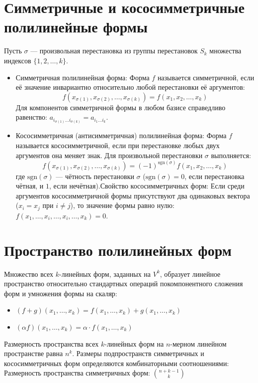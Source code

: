 \documentclass[14pt]{extreport}
\begin{document}
    \section{Симметричные и кососимметричные полилинейные формы}

    Пусть $\sigma$ — произвольная перестановка из группы перестановок $S_k$ множества индексов $\{1, 2, \dots, k\}$.
    \begin{itemize}
        \item Симметричная полилинейная форма: Форма $f$ называется симметричной, если её значение инвариантно относительно любой перестановки её аргументов:$$f(x_{\sigma(1)}, x_{\sigma(2)}, \dots, x_{\sigma(k)}) = f(x_1, x_2, \dots, x_k)$$Для компонентов симметричной формы в любом базисе справедливо равенство: $a_{i_{\sigma(1)} \dots i_{\sigma(k)}} = a_{i_1 \dots i_k}$.
        \item Кососимметричная (антисимметричная) полилинейная форма: Форма $f$ называется кососимметричной, если при перестановке любых двух аргументов она меняет знак. Для произвольной перестановки $\sigma$ выполняется:$$f(x_{\sigma(1)}, x_{\sigma(2)}, \dots, x_{\sigma(k)}) = (-1)^{\text{sgn}(\sigma)} f(x_1, x_2, \dots, x_k)$$где $\text{sgn}(\sigma)$ — чётность перестановки $\sigma$ ($\text{sgn}(\sigma) = 0$, если перестановка чётная, и $1$, если нечётная).Свойство кососимметричных форм: Если среди аргументов кососимметричной формы присутствуют два одинаковых вектора ($x_i = x_j$ при $i \neq j$), то значение формы равно нулю: $f(x_1, \dots, x_i, \dots, x_i, \dots, x_k) = 0$.
    \end{itemize}

    \section{Пространство полилинейных форм}

    Множество всех $k$-линейных форм, заданных на $V^k$, образует линейное пространство относительно стандартных операций покомпонентного сложения форм и умножения формы на скаляр:

    \begin{itemize}
        \item $(f + g)(x_1, \dots, x_k) = f(x_1, \dots, x_k) + g(x_1, \dots, x_k)$
        \item $(\alpha f)(x_1, \dots, x_k) = \alpha \cdot f(x_1, \dots, x_k)$
    \end{itemize}

    Размерность пространства всех $k$-линейных форм на $n$-мерном линейном пространстве равна $n^k$. Размеры подпространств симметричных и кососимметричных форм определяются комбинаторными соотношениями:
    Размерность пространства симметричных форм: $\binom{n+k-1}{k}$
\end{document}
